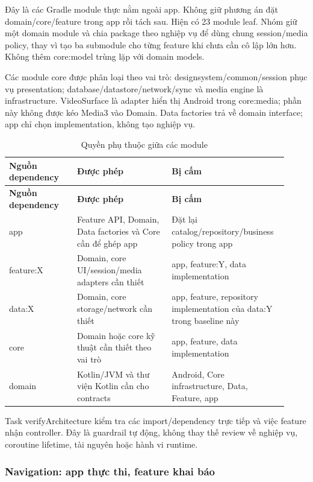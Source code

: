 Đây là các Gradle module thực nằm ngoài app. Không giữ phương án đặt domain/core/feature trong app rồi tách sau. Hiện có 23 module leaf. Nhóm giữ một domain module và chia package theo nghiệp vụ để dùng chung session/media policy, thay vì tạo ba submodule cho từng feature khi chưa cần cô lập lớn hơn. Không thêm core:model trùng lặp với domain models.

Các module core được phân loại theo vai trò: designsystem/common/session phục vụ presentation; database/datastore/network/sync và media engine là infrastructure. VideoSurface là adapter hiển thị Android trong core:media; phần này không được kéo Media3 vào Domain. Data factories trả về domain interface; app chỉ chọn implementation, không tạo nghiệp vụ.

\begingroup
\small
\renewcommand{\arraystretch}{1.2}
\setlength{\tabcolsep}{3pt}
\begin{longtable}{>{\RaggedRight\arraybackslash}p{0.23\linewidth}>{\RaggedRight\arraybackslash}p{0.32\linewidth}>{\RaggedRight\arraybackslash}p{0.37\linewidth}}
\caption{Quyền phụ thuộc giữa các module}
\label{tab:module-dependencies}\\
\toprule
\textbf{Nguồn dependency} & \textbf{Được phép} & \textbf{Bị cấm} \\
\midrule
\endfirsthead
\toprule
\textbf{Nguồn dependency} & \textbf{Được phép} & \textbf{Bị cấm} \\
\midrule
\endhead
\bottomrule
\endfoot
app & Feature API, Domain, Data factories và Core cần để ghép app & Đặt lại catalog/repository/business policy trong app \\
feature:X & Domain, core UI/session/media adapters cần thiết & app, feature:Y, data implementation \\
data:X & Domain, core storage/network cần thiết & app, feature, repository implementation của data:Y trong baseline này \\
core & Domain hoặc core kỹ thuật cần thiết theo vai trò & app, feature, data implementation \\
domain & Kotlin/JVM và thư viện Kotlin cần cho contracts & Android, Core infrastructure, Data, Feature, app \\
\end{longtable}
\endgroup

Task verifyArchitecture kiểm tra các import/dependency trực tiếp và việc feature nhận controller. Đây là guardrail tự động, không thay thế review về nghiệp vụ, coroutine lifetime, tài nguyên hoặc hành vi runtime.

\subsubsection{Navigation: app thực thi, feature khai báo}

